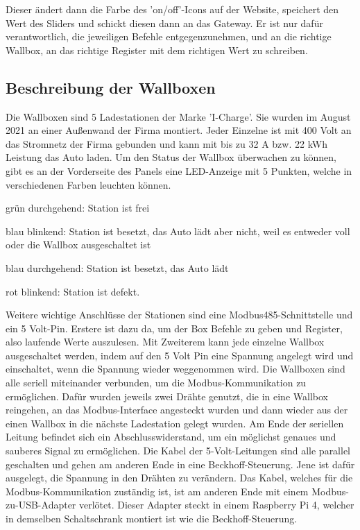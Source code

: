 Dieser ändert dann die Farbe des 'on/off'-Icons auf der Website, speichert den Wert des Sliders und schickt diesen dann an das Gateway. Er ist nur dafür verantwortlich, die jeweiligen Befehle entgegenzunehmen, und an die richtige Wallbox, an das richtige Register mit dem richtigen Wert zu schreiben.







\subsection{Beschreibung der Wallboxen} 


Die Wallboxen sind 5 Ladestationen der Marke 'I-Charge'. Sie wurden im August 2021 an einer Außenwand der Firma montiert. Jeder Einzelne ist mit 400 Volt an das Stromnetz der Firma gebunden und kann mit bis zu 32 A bzw. 22 kWh Leistung das Auto laden. Um den Status der Wallbox überwachen zu können, gibt es an der Vorderseite des Panels eine LED-Anzeige mit 5 Punkten, welche in verschiedenen Farben leuchten können.


\begin{compactitem}
\item grün durchgehend: Station ist frei
\item blau blinkend: Station ist besetzt, das Auto lädt aber nicht, weil es entweder voll oder die Wallbox ausgeschaltet ist
\item blau durchgehend: Station ist besetzt, das Auto lädt
\item rot blinkend: Station ist defekt.


\end{compactitem}


Weitere wichtige Anschlüsse der Stationen sind eine Modbus485-Schnittstelle und ein 5 Volt-Pin.
Erstere ist dazu da, um der Box Befehle zu geben und Register, also laufende Werte auszulesen. Mit Zweiterem kann jede einzelne Wallbox ausgeschaltet werden, indem auf den 5 Volt Pin eine Spannung angelegt wird und einschaltet, wenn die Spannung wieder weggenommen wird.
Die Wallboxen sind alle seriell miteinander verbunden, um die Modbus-Kommunikation zu ermöglichen. Dafür wurden jeweils zwei Drähte genutzt, die in eine Wallbox reingehen, an das Modbus-Interface angesteckt wurden und dann wieder aus der einen Wallbox in die nächste Ladestation gelegt wurden. Am Ende der seriellen Leitung befindet sich ein Abschlusswiderstand, um ein möglichst genaues und sauberes Signal zu ermöglichen. Die Kabel der 5-Volt-Leitungen sind alle parallel geschalten und gehen am anderen Ende in eine Beckhoff-Steuerung. Jene ist dafür ausgelegt, die Spannung in den Drähten zu verändern.
Das Kabel, welches für die Modbus-Kommunikation zuständig ist, ist am anderen Ende mit einem Modbus-zu-USB-Adapter verlötet. Dieser Adapter steckt in einem Raspberry Pi 4, welcher in demselben Schaltschrank montiert ist wie die Beckhoff-Steuerung.


